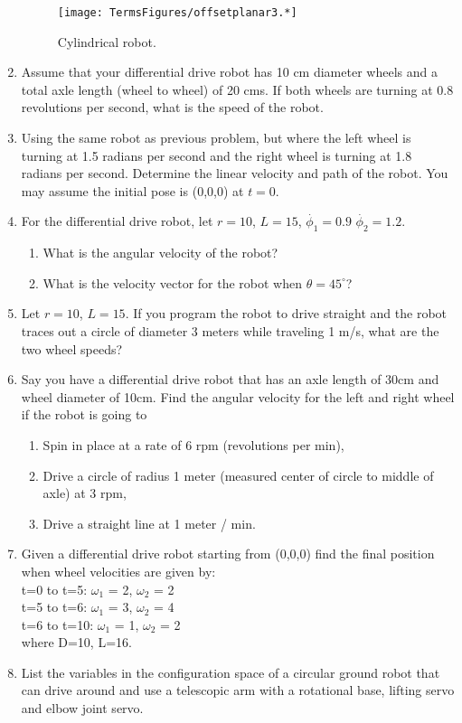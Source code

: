 \begin{enumerate}
  \leavevmode\hypertarget{Fig:offsetplanar3}{}%
  \begin{figure}
  \centering
  \texttt{[image: TermsFigures/offsetplanar3.*]}
  \caption{Cylindrical robot.}
  \end{figure}
\item
  Assume that your differential drive robot has 10 cm diameter wheels
  and a total axle length (wheel to wheel) of 20 cms. If both wheels are
  turning at 0.8 revolutions per second, what is the speed of the robot.
\item
  Using the same robot as previous problem, but where the left wheel is
  turning at 1.5 radians per second and the right wheel is turning at
  1.8 radians per second. Determine the linear velocity and path of the
  robot. You may assume the initial pose is (0,0,0) at \(t=0\).
\item
  For the differential drive robot, let \(r=10\), \(L=15\),
  \(\dot{\phi_1} = 0.9\) \(\dot{\phi_2}= 1.2\).

  \begin{enumerate}
  \def\labelenumii{\alph{enumii}.}
  \tightlist
  \item
    What is the angular velocity of the robot?
  \item
    What is the velocity vector for the robot when
    \(\theta = 45^\circ\)?
  \end{enumerate}
\item
  Let \(r=10\), \(L=15\). If you program the robot to drive straight and
  the robot traces out a circle of diameter 3 meters while traveling 1
  m/s, what are the two wheel speeds?
\item
  Say you have a differential drive robot that has an axle length of
  30cm and wheel diameter of 10cm. Find the angular velocity for the
  left and right wheel if the robot is going to

  \begin{enumerate}
  \def\labelenumii{\alph{enumii}.}
  \tightlist
  \item
    Spin in place at a rate of 6 rpm (revolutions per min),
  \item
    Drive a circle of radius 1 meter (measured center of circle to
    middle of axle) at 3 rpm,
  \item
    Drive a straight line at 1 meter / min.
  \end{enumerate}
\item
  Given a differential drive robot starting from (0,0,0) find the final
  position when wheel velocities are given by:\\
  t=0 to t=5: \(\omega_1\) = 2, \(\omega_2\) = 2\\
  t=5 to t=6: \(\omega_1\) = 3, \(\omega_2\) = 4\\
  t=6 to t=10: \(\omega_1\) = 1, \(\omega_2\) = 2\\
  where D=10, L=16.
\item
  List the variables in the configuration space of a circular ground
  robot that can drive around and use a telescopic arm with a rotational
  base, lifting servo and elbow joint servo.
\end{enumerate}
